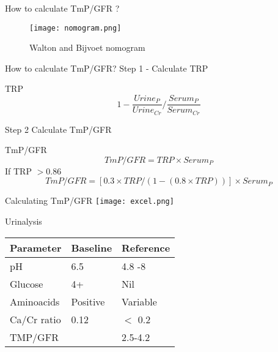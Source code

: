 \begin{frame}{How to calculate TmP/GFR ? }
		\begin{center}
			\begin{figure}
				\texttt{[image: nomogram.png]}
				\caption{Walton and Bijvoet nomogram}
			\end{figure}
		\end{center}
\end{frame} 
\begin{frame}{How to calculate TmP/GFR?  }
	Step 1 - Calculate TRP
	\begin{block}{TRP}
		\begin{equation}
		1-\dfrac{Urine _{P}}{Urine _{Cr}} / \dfrac{Serum _{P}}{Serum _{Cr}}
		\end{equation}
	\end{block}
 Step 2 Calculate TmP/GFR
 \begin{block}{TmP/GFR}
 	\begin{equation}
 		TmP/GFR =TRP \times Serum _{P}  
 	\end{equation}
 	If TRP $ > 0.86 $
 	\begin{equation}
 	TmP/GFR =[0.3 \times TRP/(1- (0.8 \times TRP))] \times Serum _{P}
 	\end{equation}
 \end{block}
\end{frame}  
\begin{frame}{Calculating TmP/GFR  }
	\texttt{[image: excel.png]}
\end{frame}  
\begin{frame} {Urinalysis}
\begin{center}
		\begin{tabular}{p{4cm}p{3.5cm}l}
			\toprule
			Parameter   & Baseline  & Reference \\ \midrule
			pH          & 6.5       & 4.8 -8    \\
			Glucose     & 4+        & Nil       \\
			Aminoacids  & Positive  & Variable  \\
			Ca/Cr ratio & 0.12      & $<$ 0.2   \\
			TMP/GFR     & \myred{1.3} & 2.5-4.2   \\ \bottomrule
		\end{tabular}
\end{center}
\end{frame}


